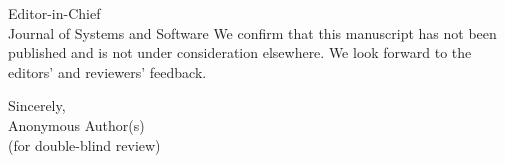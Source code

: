 \documentclass[11pt]{letter}
\begin{document}
\begin{letter}{Editor-in-Chief\\
Journal of Systems and Software}
We confirm that this manuscript has not been published and is not under consideration elsewhere. We look forward to the editors' and reviewers' feedback.

\closing{Sincerely,\\[1em]
Anonymous Author(s)\\
(for double-blind review)}

\end{letter}
\end{document}
